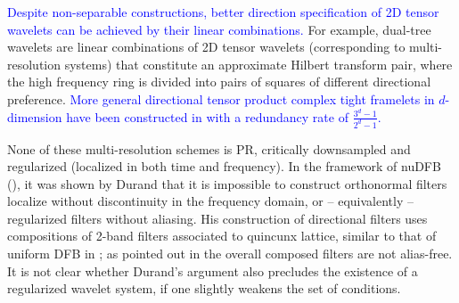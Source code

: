 \textcolor{blue}{Despite non-separable constructions, better direction specification of 2D tensor wavelets can be achieved by their linear combinations.}
For example, dual-tree wavelets \cite{selesnick2005dual} are linear combinations of 2D tensor wavelets (corresponding to multi-resolution systems) that constitute an approximate Hilbert transform pair, where the high frequency ring is divided into pairs of squares of different directional preference.
\textcolor{blue}{More general directional tensor product complex tight framelets in $d$-dimension have been constructed in \cite{han2016directional} with a redundancy rate of $\frac{3^d -1}{2^d-1}$.
}

None of these multi-resolution schemes is PR, critically downsampled and regularized (localized in both time and frequency). In the framework of nuDFB (\cite{nuDFB05}), it was shown by Durand \cite{durand2007} that it is impossible to construct orthonormal filters localize without discontinuity in the frequency domain, or -- equivalently -- regularized filters without aliasing. His construction of directional filters uses compositions of 2-band filters associated to quincunx lattice, similar to that of uniform DFB in \cite{nuDFB05}; as pointed out in \cite{nuDFB05} the overall composed filters are not alias-free. It is not clear whether Durand's argument also precludes the existence of a regularized wavelet system, if one slightly weakens the set of conditions.

